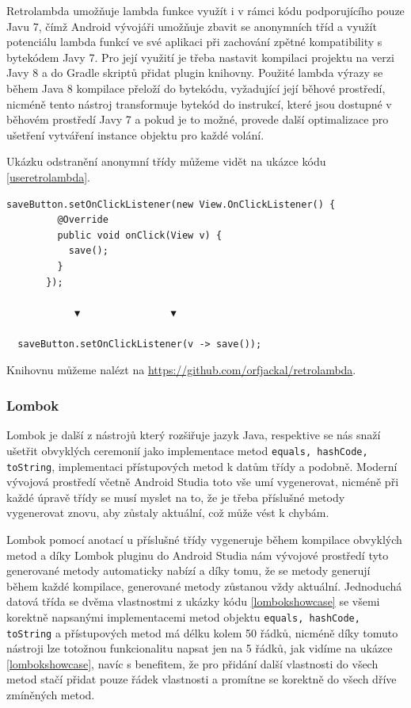 \documentclass[czech,master,public,dept460,male,java,cpdeclaration]{diploma}
\begin{document}
Retrolambda umožňuje lambda funkce využít i v rámci kódu podporujícího pouze Javu 7,
čímž Android vývojáři umožňuje zbavit se anonymních tříd a využít potenciálu lambda funkcí
ve své aplikaci při zachování zpětné kompatibility s bytekódem Javy 7. Pro její využití je třeba
nastavit kompilaci projektu na verzi Javy 8 a do Gradle skriptů přidat plugin knihovny. Použité
lambda výrazy se během Java 8 kompilace přeloží do bytekódu, vyžadující její běhové prostředí,
nicméně tento nástroj transformuje bytekód do instrukcí, které jsou dostupné v běhovém prostředí
Javy 7 a pokud je to možné, provede další optimalizace pro ušetření vytváření instance objektu
pro každé volání.

Ukázku odstranění anonymní třídy můžeme vidět na ukázce kódu \ref{useretrolambda}.

\begin{lstlisting}[label=useretrolambda,caption=Odstrnění kódu anonymní třídy pomocí knihovny Retrolambda]
   saveButton.setOnClickListener(new View.OnClickListener() {
         @Override
         public void onClick(View v) {
           save();
         }
       });

            ▼                ▼

  saveButton.setOnClickListener(v -> save());
\end{lstlisting}

Knihovnu můžeme nalézt na \url{https://github.com/orfjackal/retrolambda}.

\subsubsection{Lombok}
Lombok je další z nástrojů který rozšiřuje jazyk Java, respektive se nás snaží ušetřit obvyklých
ceremonií jako implementace metod \texttt{equals, hashCode, toString}, implementaci přístupových
metod k datům třídy a podobně. Moderní vývojová prostředí včetně Android Studia toto vše umí
vygenerovat, nicméně při každé úpravě třídy se musí myslet na to, že je třeba příslušné metody
vygenerovat znovu, aby zůstaly aktuální, což může vést k chybám.

Lombok pomocí anotací u příslušné třídy vygeneruje během kompilace obvyklých metod a díky Lombok
pluginu do Android Studia nám vývojové prostředí tyto generované metody automaticky nabízí a díky tomu,
že se metody generují během každé kompilace, generované metody zůstanou vždy aktuální. Jednoduchá datová
třída se dvěma vlastnostmi z ukázky kódu \ref{lombokshowcase} se všemi korektně napsanými implementacemi
metod objektu \texttt{equals, hashCode, toString} a přístupových metod má délku kolem 50 řádků, nicméně
díky tomuto nástroji lze totožnou funkcionalitu napsat jen na 5 řádků, jak vidíme na ukázce \ref{lombokshowcase},
navíc s benefitem, že pro přidání další vlastnosti do všech metod stačí přidat pouze řádek vlastnosti
a promítne se korektně do všech dříve zmíněných metod.
\end{document}
